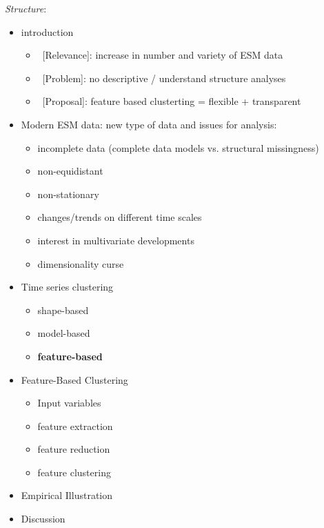 \documentclass[man, 12pt, a4paper]{apa7}
\theoremstyle{break}
\theoremstyle{plain}
\begin{document}
\begin{mdframed}[style=mdfbox]
\noindent\center\textit{Structure}:
\begin{itemize}[nosep]
    \item introduction
    \begin{itemize}[nosep]
        \item\ [Relevance]: increase in number and variety of ESM data
        \item\ [Problem]: no descriptive / understand structure analyses
        \item\ [Proposal]: feature based clusterting = flexible +  transparent
    \end{itemize}
    \item Modern ESM data: new type of data and issues for analysis:
    \begin{itemize}[nosep]
        \item incomplete data (complete data models vs. structural missingness)
        \item non-equidistant
        \item non-stationary
        \item changes/trends on different time scales
        \item interest in multivariate developments
        \item dimensionality curse
    \end{itemize}
    \item Time series clustering
    \begin{itemize}[nosep]
        \item shape-based
        \item model-based
        \item \textbf{feature-based}
    \end{itemize}
    \item Feature-Based Clustering
    \begin{itemize}[nosep]
        \item Input variables
        \item feature extraction
        \item feature reduction
        \item feature clustering
    \end{itemize}
    \item Empirical Illustration
    \item Discussion
\end{itemize}
\end{mdframed}
\end{document}
